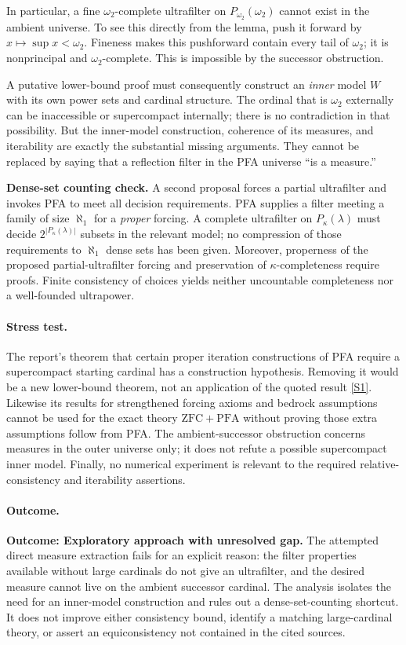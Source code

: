 \documentclass[11pt,a4paper]{article}
\newcommand{\sref}[2]{\hyperlink{source:#1:#2}{[S#2]}}
\numberwithin{equation}{section}
\begin{document}
In particular, a fine $\omega_2$-complete ultrafilter on $P_{\omega_2}(\omega_2)$ cannot exist in the ambient universe. To see this directly from the lemma, push it forward by $x\mapsto\sup x<\omega_2$. Fineness makes this pushforward contain every tail of $\omega_2$; it is nonprincipal and $\omega_2$-complete. This is impossible by the successor obstruction.

A putative lower-bound proof must consequently construct an \emph{inner} model $W$ with its own power sets and cardinal structure. The ordinal that is $\omega_2$ externally can be inaccessible or supercompact internally; there is no contradiction in that possibility. But the inner-model construction, coherence of its measures, and iterability are exactly the substantial missing arguments. They cannot be replaced by saying that a reflection filter in the PFA universe ``is a measure.''

\textbf{Dense-set counting check.} A second proposal forces a partial ultrafilter and invokes PFA to meet all decision requirements. PFA supplies a filter meeting a family of size $\aleph_1$ for a \emph{proper} forcing. A complete ultrafilter on $P_\kappa(\lambda)$ must decide $2^{|P_\kappa(\lambda)|}$ subsets in the relevant model; no compression of those requirements to $\aleph_1$ dense sets has been given. Moreover, properness of the proposed partial-ultrafilter forcing and preservation of $\kappa$-completeness require proofs. Finite consistency of choices yields neither uncountable completeness nor a well-founded ultrapower.

\paragraph{Stress test.}
The report's theorem that certain proper iteration constructions of PFA require a supercompact starting cardinal has a construction hypothesis. Removing it would be a new lower-bound theorem, not an application of the quoted result \sref{193}{1}. Likewise its results for strengthened forcing axioms and bedrock assumptions cannot be used for the exact theory $\mathrm{ZFC}+\mathrm{PFA}$ without proving those extra assumptions follow from PFA. The ambient-successor obstruction concerns measures in the outer universe only; it does not refute a possible supercompact inner model. Finally, no numerical experiment is relevant to the required relative-consistency and iterability assertions.

\paragraph{Outcome.}
\textbf{Outcome: Exploratory approach with unresolved gap.}
The attempted direct measure extraction fails for an explicit reason: the filter properties available without large cardinals do not give an ultrafilter, and the desired measure cannot live on the ambient successor cardinal. The analysis isolates the need for an inner-model construction and rules out a dense-set-counting shortcut. It does not improve either consistency bound, identify a matching large-cardinal theory, or assert an equiconsistency not contained in the cited sources.
\end{document}
